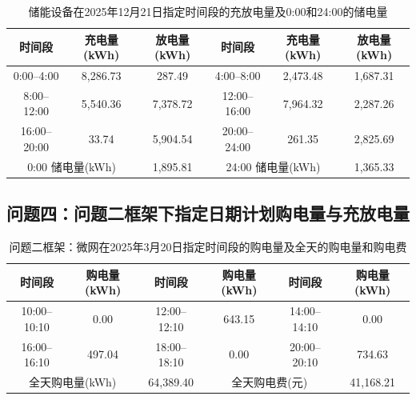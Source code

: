 \begin{table}[H]
  \centering
  \caption{储能设备在2025年12月21日指定时间段的充放电量及0:00和24:00的储电量}
  \label{tab:q3-storage-1221}
  \small
  \renewcommand{\arraystretch}{1.3}
  \begin{tabular}{|c|c|c|c|c|c|}
    \hline
    时间段 & 充电量(kWh) & 放电量(kWh) & 时间段 & 充电量(kWh) & 放电量(kWh) \\
    \hline
    0:00--4:00 & 8{,}286.73 & 287.49 & 4:00--8:00 & 2{,}473.48 & 1{,}687.31 \\
    \hline
    8:00--12:00 & 5{,}540.36 & 7{,}378.72 & 12:00--16:00 & 7{,}964.32 & 2{,}287.26 \\
    \hline
    16:00--20:00 & 33.74 & 5{,}904.54 & 20:00--24:00 & 261.35 & 2{,}825.69 \\
    \hline
    \multicolumn{2}{|c|}{0:00 储电量(kWh)} & \multicolumn{1}{c|}{1{,}895.81} & \multicolumn{2}{c|}{24:00 储电量(kWh)} & \multicolumn{1}{c|}{1{,}365.33} \\
    \hline
  \end{tabular}
\end{table}

\subsection*{问题四：问题二框架下指定日期计划购电量与充放电量}

\begin{table}[H]
  \centering
  \caption{问题二框架：微网在2025年3月20日指定时间段的购电量及全天的购电量和购电费}
  \label{tab:q4-2-purchase-0320}
  \small
  \renewcommand{\arraystretch}{1.3}
  \begin{tabular}{|c|c|c|c|c|c|}
    \hline
    时间段 & 购电量(kWh) & 时间段 & 购电量(kWh) & 时间段 & 购电量(kWh) \\
    \hline
    10:00--10:10 & 0.00 & 12:00--12:10 & 643.15 & 14:00--14:10 & 0.00 \\
    \hline
    16:00--16:10 & 497.04 & 18:00--18:10 & 0.00 & 20:00--20:10 & 734.63 \\
    \hline
    \multicolumn{2}{|c|}{全天购电量(kWh)} & \multicolumn{1}{c|}{64{,}389.40} & \multicolumn{2}{c|}{全天购电费(元)} & \multicolumn{1}{c|}{41{,}168.21} \\
    \hline
  \end{tabular}
\end{table}

